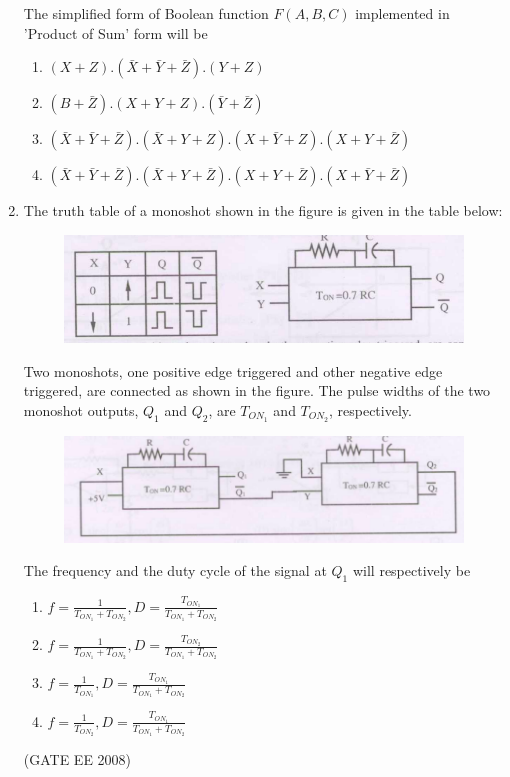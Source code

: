 \documentclass[journal,12pt,onecolumn]{IEEEtran}
\theoremstyle{remark}
\begin{document}
\begin{enumerate}[start=1, label=Q.\arabic*]
The simplified form of Boolean function $F(A,B,C)$ implemented in 'Product of Sum' form will be


\begin{enumerate}
    \item $(X+Z).(\bar{X}+\bar{Y}+\bar{Z}).(Y+Z)$
    \item $(B+\bar{Z}).(X+Y+Z).(\bar{Y}+\bar{Z})$
    \item $(\bar{X}+\bar{Y}+\bar{Z}).(\bar{X}+Y+Z).(X+\bar{Y}+Z).(X+Y+\bar{Z})$
    \item $(\bar{X}+\bar{Y}+\bar{Z}).(\bar{X}+Y+\bar{Z}).(X+Y+\bar{Z}).(X+\bar{Y}+\bar{Z})$
\end{enumerate}


\item  The truth table of a monoshot shown in the figure is given in the table below:
\begin{figure}[H]
    \centering
    \includegraphics[width=\columnwidth]{Fig/q44.png}
    \caption{}
\end{figure}

Two monoshots, one positive edge triggered and other negative edge triggered, are connected as shown in the figure. The pulse widths of the two monoshot outputs, $Q_1$ and $Q_2$, are $T_{ON_1}$ and $T_{ON_2}$, respectively.

\begin{figure}[H]
    \centering
    \includegraphics[width=\columnwidth]{Fig/q44-2.png}
    \caption{}
\end{figure}
The frequency and the duty cycle of the signal at $Q_1$ will respectively be

\begin{multicols}{2}
\begin{enumerate}
    \item $f = \frac{1}{T_{ON_1}+T_{ON_2}}, D = \frac{T_{ON_1}}{T_{ON_1}+T_{ON_2}}$
    \item $f = \frac{1}{T_{ON_1}+T_{ON_2}}, D = \frac{T_{ON_2}}{T_{ON_1}+T_{ON_2}}$
    \item $f = \frac{1}{T_{ON_1}}, D = \frac{T_{ON_1}}{T_{ON_1}+T_{ON_2}}$
    \item $f = \frac{1}{T_{ON_2}}, D = \frac{T_{ON_1}}{T_{ON_1}+T_{ON_2}}$
\end{enumerate}
\end{multicols}
\hfill (GATE EE 2008)


\end{enumerate}
\end{document}
